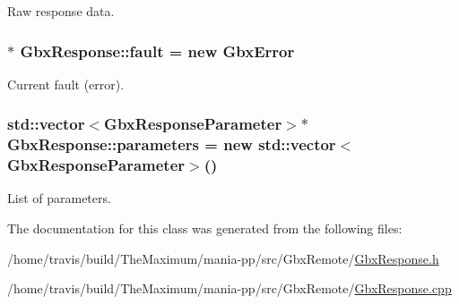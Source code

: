 Raw response data. 

\hypertarget{classGbxResponse_ad896e7447681008320ad9945b57a92ad}{
\subsubsection[{fault}]{$\ast$ Gbx\-Response\-::fault = new {\bf Gbx\-Error}\hspace{0.3cm}{\ttfamily [private]}}}\label{classGbxResponse_ad896e7447681008320ad9945b57a92ad}


Current fault (error). 

\hypertarget{classGbxResponse_afcbec4555fa682d9d1360ecff829d0f2}{
\subsubsection[{parameters}]{\setlength{\rightskip}{0pt plus 5cm}std\-::vector$<${\bf Gbx\-Response\-Parameter}$>$$\ast$ Gbx\-Response\-::parameters = new std\-::vector$<${\bf Gbx\-Response\-Parameter}$>$()\hspace{0.3cm}{\ttfamily [private]}}}\label{classGbxResponse_afcbec4555fa682d9d1360ecff829d0f2}


List of parameters. 



The documentation for this class was generated from the following files\-:\begin{DoxyCompactItemize}
\item 
/home/travis/build/\-The\-Maximum/mania-\/pp/src/\-Gbx\-Remote/\hyperlink{GbxResponse_8h}{Gbx\-Response.\-h}\item 
/home/travis/build/\-The\-Maximum/mania-\/pp/src/\-Gbx\-Remote/\hyperlink{GbxResponse_8cpp}{Gbx\-Response.\-cpp}\end{DoxyCompactItemize}
